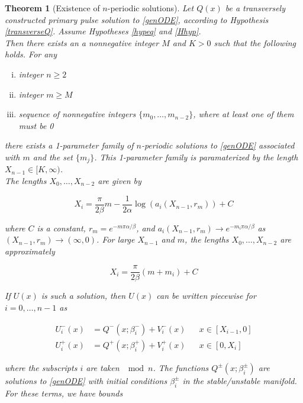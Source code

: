 \documentclass[12pt]{article}
\newtheorem{theorem}{Theorem}
\begin{document}
\begin{theorem}[Existence of $n$-periodic solutions]\label{multiexist}
Let $Q(x)$ be a transversely constructed primary pulse solution to \eqref{genODE}, according to Hypothesis \ref{transverseQ}. Assume Hypotheses \ref{hypeq} and \ref{Hhyp}.\\

Then there exists an a nonnegative integer $M$ and $K > 0$ such that the following holds. For any 
\begin{enumerate}[(i)]
\item integer $n \geq 2$ \\
\item integer $m \geq M$ \\
\item sequence of nonnegative integers $\{ m_0, \dots, m_{n-2} \}$, where at least one of them must be 0
\end{enumerate}

there exists a 1-parameter family of $n$-periodic solutions to \eqref{genODE} associated with $m$ and the set $\{ m_j \}$. This 1-parameter family is paramaterized by the length $X_{n-1} \in [K, \infty)$.\\

The lengths $X_0, \dots, X_{n-2}$ are given by

\begin{equation}\label{Xi}
X_i = \frac{\pi}{2 \beta}m 
- \frac{1}{2 \alpha} \log(a_i(X_{n-1}, r_m)) + C
\end{equation}

where $C$ is a constant, $r_m = e^{-m \pi \alpha/\beta}$, and $a_i(X_{n-1}, r_m) \rightarrow e^{-m_i \pi \alpha/ \beta}$ as $(X_{n-1}, r_m) \rightarrow (\infty, 0)$. For large $X_{n-1}$ and $m$, the lengths $X_0, \dots, X_{n-2}$ are approximately

\begin{equation}\label{Xiapprox}
X_i = \frac{\pi}{2 \beta}(m + m_i) + C
\end{equation}

If $U(x)$ is such a solution, then $U(x)$ can be written piecewise for $i = 0, \dots, n-1$ as 

\begin{align}
U_i^-(x) &= Q^-(x; \beta_i^-) + V_i^-(x) && x \in [X_{i-1}, 0] \\
U_i^+(x) &= Q^+(x; \beta_i^+) + V_i^+(x) && x \in [0, X_i]
\end{align}

where the subscripts $i$ are taken $\mod n$. The functions $Q^\pm(x; \beta_i^\pm)$ are solutions to \eqref{genODE} with initial conditions $\beta_i^\pm$ in the stable/unstable manifold. For these terms, we have bounds


\end{theorem}
\end{document}
